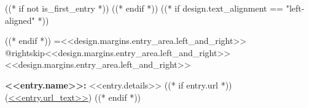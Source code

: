 ((* if not is_first_entry *))
\vspace{<<design.margins.entry_area.vertical_between>>}
((* endif *))
\begingroup((* if design.text_alignment == "left-aligned" *))\raggedright((* endif *))
\leftskip=<<design.margins.entry_area.left_and_right>>
\advance\csname @rightskip\endcsname <<design.margins.entry_area.left_and_right>>
\advance\rightskip <<design.margins.entry_area.left_and_right>>

\textbf{<<entry.name>>:} <<entry.details>> ((* if entry.url *)) (\href{<<entry.url>>}{<<entry.url_text>>}) ((* endif *))
\par\endgroup